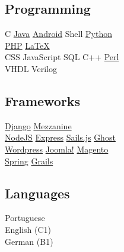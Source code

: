 \documentclass[]{willianpaixao-resume}
\begin{document}
\begin{minipage}[t]{0.35\textwidth}
\subsection{Programming}
C \textbullet
\href{https://www.oracle.com/java/}{Java} \textbullet{}
\href{http://android.com}{Android} \textbullet{}
Shell \textbullet{}
\href{http://www.python.org}{Python}\\
\href{http://www.php.net}{PHP} \textbullet{}
\href{http://www.latex-project.org}{\LaTeX} \\
CSS \textbullet{}
JavaScript \textbullet{}
SQL \textbullet{}
C++ \textbullet{}
\href{https://www.perl.org/}{Perl} \\
VHDL \textbullet{}
Verilog
\sectionsep

\subsection{Frameworks}
\href{https://www.djangoproject.com/}{Django} \textbullet{}
\href{http://mezzanine.jupo.org/}{Mezzanine} \\
\href{https://nodejs.org/en/}{NodeJS} \textbullet
\href{https://expressjs.com/}{Express} \textbullet
\href{http://sailsjs.org/}{Sails.js} \textbullet
\href{https://ghost.org/}{Ghost} \\
\href{https://wordpress.com/}{Wordpress} \textbullet
\href{https://www.joomla.org/}{Joomla!} \textbullet
\href{https://magento.com/}{Magento} \\
\href{https://spring.io/}{Spring} \textbullet
\href{https://grails.org/}{Grails}
\sectionsep

\subsection{Languages}
Portuguese \\
English (C1) \\
German (B1)


\end{minipage} 
\end{document}
